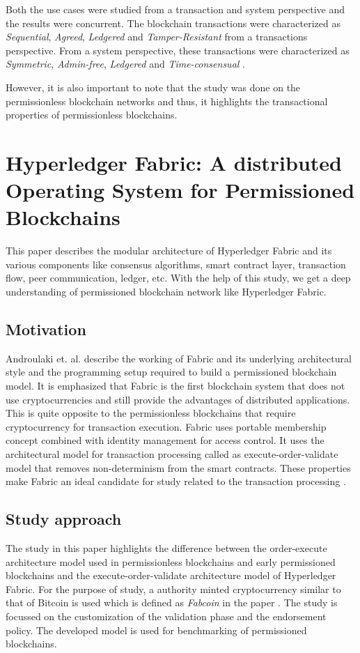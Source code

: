 \documentclass[
  a4paper,  %
  twoside,  %
  bibliography=totoc,
  headsepline,
  cleardoublepage=empty,
  parskip=half,
  draft=false
]{scrbook}
\begin{document}
Both the use cases were studied from a transaction and system perspective and the results were concurrent. The blockchain transactions were characterized as \textit{Sequential}, \textit{Agreed}, \textit{Ledgered} and \textit{Tamper-Resistant} from a transactions perspective. From a system perspective, these transactions were characterized as \textit{Symmetric}, \textit{Admin-free}, \textit{Ledgered} and \textit{Time-consensual} \cite{Salt}.

However, it is also important to note that the study was done on the permissionless blockchain networks and thus, it highlights the transactional properties of permissionless blockchains.

\section{Hyperledger Fabric: A distributed Operating System for Permissioned Blockchains }
\label{sec:2}
This paper \cite{HF} describes the modular architecture of Hyperledger Fabric and its various components like consensus algorithms, smart contract layer, transaction flow, peer communication, ledger, etc. With the help of this study, we get a deep understanding of permissioned blockchain network like Hyperledger Fabric.

\subsection{Motivation}
Androulaki et. al. describe the working of Fabric and its underlying architectural style and the programming setup required to build a permissioned blockchain model. It is emphasized that Fabric is the first blockchain system that does not use cryptocurrencies and still provide the advantages of distributed applications. This is quite opposite to the permissionless blockchains that require cryptocurrency for transaction execution. Fabric uses portable membership concept combined with identity management for access control. It uses the architectural model for transaction processing called as execute-order-validate model that removes non-determinism from the smart contracts. These properties make Fabric an ideal candidate for study related to the transaction processing \cite{HF}. 

\subsection{Study approach}
The study in this paper highlights the difference between the order-execute architecture model used in permissionless blockchains and early permissioned blockchains and the execute-order-validate architecture model of Hyperledger Fabric. For the purpose of study, a authority minted cryptocurrency similar to that of Bitcoin is used which is defined as \textit{Fabcoin} in the paper \cite{HF}. The study is focussed on the customization of the validation phase and the endorsement policy. The developed model is used for benchmarking of permissioned blockchains.
\end{document}
